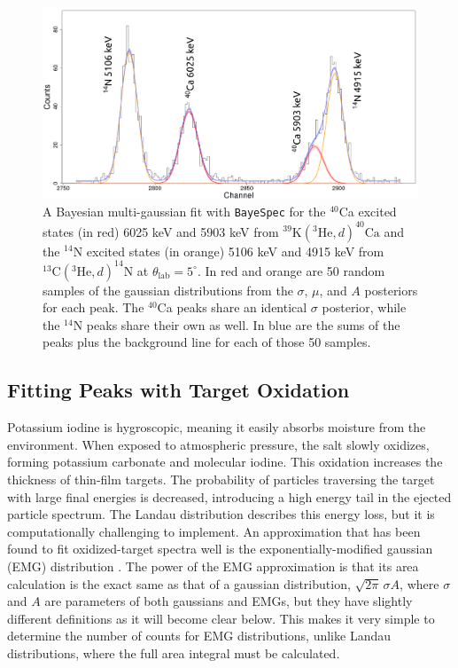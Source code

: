 \begin{figure}[t]
\centering
\includegraphics[width=6.5in]{Chapter-6/figs/Gaus_Bayesian.png}
\caption{\label{fig:Gaus_Bayesian}A Bayesian multi-gaussian fit with \texttt{BayeSpec} for the $^{40}$Ca excited states (in red) 6025 keV and 5903 keV from $^{39}\mathrm{K}(^{3}\mathrm{He},d)^{40}\mathrm{Ca}$ and the $^{14}$N excited states (in orange) 5106 keV and 4915 keV from $^{13}\mathrm{C}(^{3}\mathrm{He},d)^{14}\mathrm{N}$ at $\theta_{\mathrm{lab}} = 5^{\circ}$. In red and orange are 50 random samples of the gaussian distributions from the $\sigma$, $\mu$, and $A$ posteriors for each peak. The $^{40}$Ca peaks share an identical $\sigma$ posterior, while the $^{14}$N peaks share their own as well. In blue are the sums of the peaks plus the background line for each of those 50 samples.}
\end{figure}

\subsection{Fitting Peaks with Target Oxidation} \label{subsec:oxidation}

Potassium iodine is hygroscopic, meaning it easily absorbs moisture from the environment. When exposed to atmospheric pressure, the salt slowly oxidizes, forming potassium carbonate and molecular iodine. This oxidation increases the thickness of thin-film targets. The probability of particles traversing the target with large final energies is decreased, introducing a high energy tail in the ejected particle spectrum. The Landau distribution describes this energy loss, but it is computationally challenging to implement. An approximation that has been found to fit oxidized-target spectra well is the exponentially-modified gaussian (EMG) distribution \cite{Babu2016}. The power of the EMG approximation is that its area calculation is the exact same as that of a gaussian distribution, $\sqrt{2\pi} \, \sigma A$, where $\sigma$ and $A$ are parameters of both gaussians and EMGs, but they have slightly different definitions as it will become clear below. This makes it very simple to determine the number of counts for EMG distributions, unlike Landau distributions, where the full area integral must be calculated.

